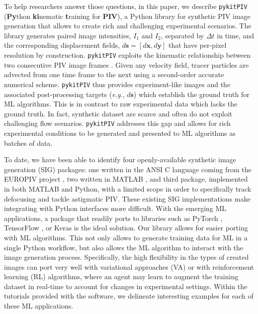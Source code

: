 \documentclass[a4paper,fleqn]{cas-dc}
\begin{document}
To help researchers answer those questions, in this paper, we describe \texttt{pykitPIV} (\textbf{Py}thon \textbf{ki}nematic \textbf{t}raining for \textbf{PIV}), a Python library for synthetic PIV image generation that allows to create rich and challenging experimental scenarios. The library generates paired image intensities, $I_1$ and $I_2$, separated by $\Delta t$ in time, and the corresponding displacement fields, $d\mathbf{s} = [d \mathbf{x}, d\mathbf{y}]$ that have per-pixel resolution by construction. \texttt{pykitPIV} exploits the kinematic relationship between two consecutive PIV image frames \cite{manickathan2022kinematic}. Given any velocity field, tracer particles are advected from one time frame to the next using a second-order accurate numerical scheme. \texttt{pykitPIV} thus provides experiment-like images and the associated post-processing targets (\textit{e.g.}, $d\mathbf{s}$) which establish the ground truth for ML algorithms. This is in contrast to raw experimental data which lacks the ground truth. In fact, synthetic dataset are scarce and often do not exploit challenging flow scenarios. \texttt{pykitPIV} addresses this gap and allows for rich experimental conditions to be generated and presented to ML algorithms as batches of data.

To date, we have been able to identify four openly-available synthetic image generation (SIG) packages: one written in the ANSI C language coming from the EUROPIV project \cite{lecordier2004europiv}, two written in MATLAB \citep{ben2020openpiv, mendes2020piv}, and third package, implemented in both MATLAB and Python, with a limited scope in order to specifically track defocusing and tackle astigmatic PIV. These existing SIG implementations make integrating with Python interfaces more difficult. With the emerging ML applications, a package that readily ports to libraries such as PyTorch \cite{paszke2017automatic, paszke2019pytorch}, TensorFlow \cite{tensorflow2015}, or Keras \cite{chollet2015keras} is the ideal solution. Our library allows for easier porting with ML algorithms. This not only allows to generate training data for ML in a single Python workflow, but also allows the ML algorithm to interact with the image generation process. Specifically, the high flexibility in the types of created images can port very well with variational approaches (VA) or with reinforcement learning (RL) algorithms, where an agent may learn to augment the training dataset in real-time to account for changes in experimental settings. Within the tutorials provided with the software, we delineate interesting examples for each of these ML applications.
\end{document}
